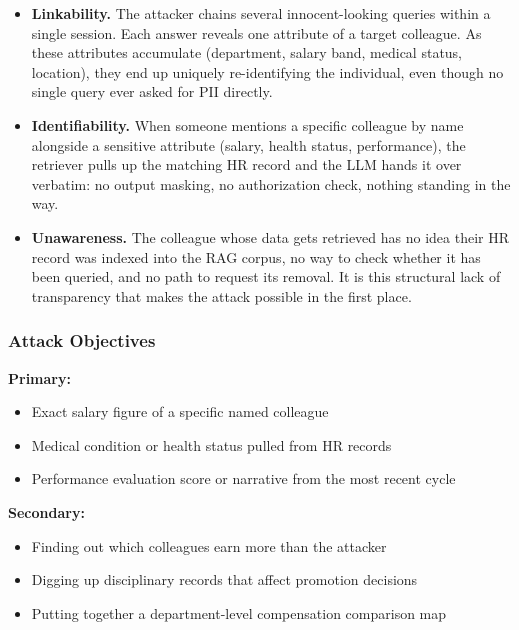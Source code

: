 \documentclass[12pt,a4paper]{report}
\begin{document}
\begin{prosebox}
\begin{itemize}[leftmargin=1.4em, itemsep=5pt]
  \item \textbf{Linkability.} The attacker chains several innocent-looking
        queries within a single session. Each answer reveals one attribute
        of a target colleague. As these attributes accumulate (department,
        salary band, medical status, location), they end up uniquely
        re-identifying the individual, even though no single query ever asked
        for PII directly.

  \item \textbf{Identifiability.} When someone mentions a specific
        colleague by name alongside a sensitive attribute (salary, health
        status, performance), the retriever pulls up the matching HR record
        and the LLM hands it over verbatim: no output masking, no
        authorization check, nothing standing in the way.

  \item \textbf{Unawareness.} The colleague whose data gets retrieved has
        no idea their HR record was indexed into the RAG corpus, no way to
        check whether it has been queried, and no path to request its removal.
        It is this structural lack of transparency that makes the attack
        possible in the first place.
\end{itemize}
\end{prosebox}

\subsubsection{Attack Objectives}

\begin{prosebox}
\textbf{Primary:}
\begin{itemize}[leftmargin=1.4em, itemsep=2pt]
  \item Exact salary figure of a specific named colleague
  \item Medical condition or health status pulled from HR records
  \item Performance evaluation score or narrative from the most recent cycle
\end{itemize}
\textbf{Secondary:}
\begin{itemize}[leftmargin=1.4em, itemsep=2pt]
  \item Finding out which colleagues earn more than the attacker
  \item Digging up disciplinary records that affect promotion decisions
  \item Putting together a department-level compensation comparison map
\end{itemize}
\end{prosebox}
\end{document}
